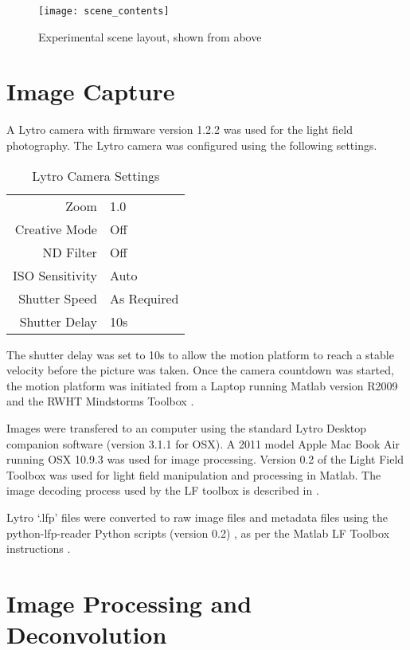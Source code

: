 \begin{figure}[h]
\centering
\texttt{[image: scene\_contents]}
\caption[Experimental scene layout]{Experimental scene layout, shown from above}
\label{fig:scene_description}
\end{figure}


\section{Image Capture}
\label{sec:image_capture}

A Lytro camera with firmware version 1.2.2 was used for the light field photography.
The Lytro camera was configured using the following settings.

\begin{table}[h]
\centering
\caption{Lytro Camera Settings}
\label{tab:lytro_settings}
\begin{tabular}{r | l}
Zoom & 1.0 \\
Creative Mode & Off \\
ND Filter & Off \\
ISO Sensitivity & Auto \\
Shutter Speed & As Required \\
Shutter Delay & 10s \\
\end{tabular}
\end{table}

The shutter delay was set to 10s to allow the motion platform to reach a stable velocity before the picture was taken.
Once the camera countdown was started, the motion platform was initiated from a Laptop running Matlab version R2009 and the RWHT Mindstorms Toolbox \cite{rwth2007toolbox}.

Images were transfered to an computer using the standard Lytro Desktop companion software (version 3.1.1 for OSX).
A 2011 model Apple Mac Book Air running OSX 10.9.3 was used for image processing.
Version 0.2 of the Light Field Toolbox \cite{dansereau2013toolbox} was used for light field manipulation and processing in Matlab.
The image decoding process used by the LF toolbox is described in \cite{dansereau2013decoding}.

Lytro \enquote*{.lfp} files were converted to raw image files and metadata files using the python-lfp-reader Python scripts (version 0.2) \cite{esfahbod2013python}, as per the Matlab LF Toolbox instructions \cite{dansereau2013toolbox}.

\section{Image Processing and Deconvolution}
\label{sec:image_processing_and_deconvolution}


